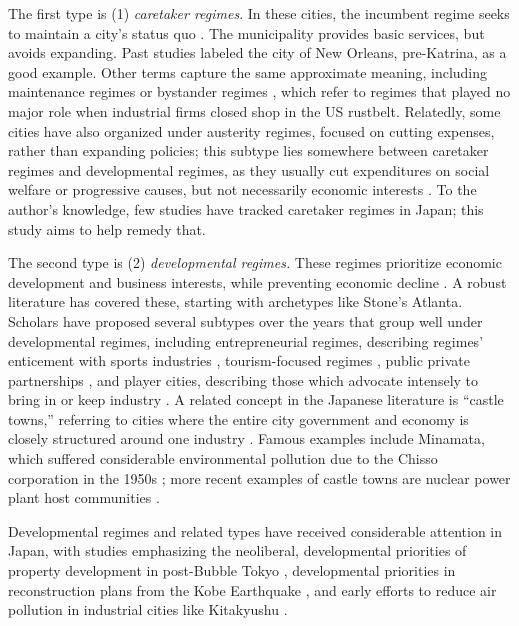 \documentclass[preprint, 3p,
authoryear]{elsarticle} %
\begin{document}
The first type is (1) \emph{caretaker regimes}. In these cities, the
incumbent regime seeks to maintain a city's status quo
\citep{turner_1992, whelan_et_al_1994}. The municipality provides basic
services, but avoids expanding. Past studies labeled the city of New
Orleans, pre-Katrina, as a good example. Other terms capture the same
approximate meaning, including maintenance regimes \citep{stone_1989} or
bystander regimes \citep{portz_1990}, which refer to regimes that played
no major role when industrial firms closed shop in the US rustbelt.
Relatedly, some cities have also organized under austerity regimes,
focused on cutting expenses, rather than expanding policies; this
subtype lies somewhere between caretaker regimes and developmental
regimes, as they usually cut expenditures on social welfare or
progressive causes, but not necessarily economic interests
\citep{davies_and_blanco_2017}. To the author's knowledge, few studies
have tracked caretaker regimes in Japan; this study aims to help remedy
that.

The second type is (2) \emph{developmental regimes.} These regimes
prioritize economic development and business interests, while preventing
economic decline
\citep{stone_1989, austrian_and_rosentraub_2002, de_socio_2007}. A
robust literature has covered these, starting with archetypes like
Stone's \citeyearpar{stone_1989} Atlanta. Scholars have proposed several
subtypes over the years that group well under developmental regimes,
including entrepreneurial regimes, describing regimes' enticement with
sports industries \citep{euchner_1993}, tourism-focused regimes
\citep{russo_and_scarnato_2018}, public private partnerships
\citep{davies_2017}, and player cities, describing those which advocate
intensely to bring in or keep industry \citep{portz_1990}. A related
concept in the Japanese literature is ``castle towns,'' referring to
cities where the entire city government and economy is closely
structured around one industry \citep{hill_and_fujita_1993}. Famous
examples include Minamata, which suffered considerable environmental
pollution due to the Chisso corporation in the 1950s
\citep{funabashi_2006}; more recent examples of castle towns are nuclear
power plant host communities \citep{aldrich_and_fraser_2017}.

Developmental regimes and related types have received considerable
attention in Japan, with studies emphasizing the neoliberal,
developmental priorities of property development in post-Bubble Tokyo
\citep{saito_2003, tsukamoto_2012, sorensen_et_al_2010}, developmental
priorities in reconstruction plans from the Kobe Earthquake
\citep{edgington_2010}, and early efforts to reduce air pollution in
industrial cities like Kitakyushu \citep{yeum_2002}.
\end{document}
